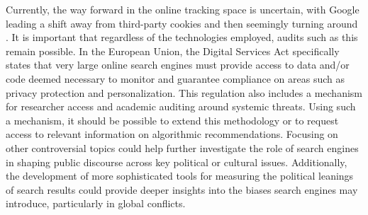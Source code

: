 Currently, the way forward in the online tracking space is uncertain, with Google leading a shift away from third-party cookies and then seemingly turning around \cite{google_privacy_sandbox}. It is important that regardless of the technologies employed,  audits such as this remain possible. In the European Union, the Digital Services Act specifically states that very large online search engines must provide access to data and/or code deemed necessary to monitor and guarantee compliance on areas such as privacy protection and personalization. This regulation also includes a mechanism for researcher access and academic auditing around systemic threats. Using such a mechanism, it should be possible to extend this methodology or to request access to relevant information on algorithmic recommendations. Focusing on other controversial topics could help further investigate the role of search engines in shaping public discourse across key political or cultural issues. Additionally, the development of more sophisticated tools for measuring the political leanings of search results could provide deeper insights into the biases search engines may introduce, particularly in global conflicts.